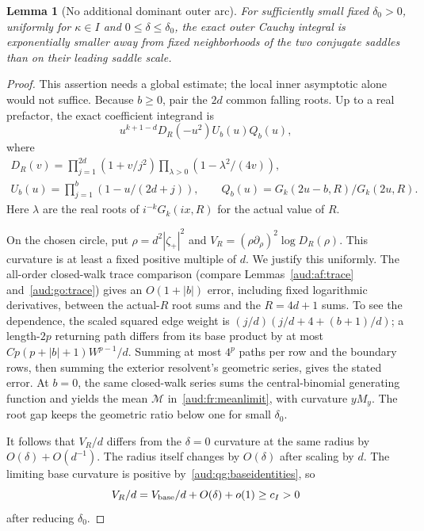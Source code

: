 \documentclass[11pt,a4paper]{article}
\numberwithin{equation}{section}
\newtheorem{lemma}[theorem]{Lemma}
\begin{document}
\begin{lemma}[No additional dominant outer arc]\label{aud:qg:outerglobal}
For sufficiently small fixed $\delta_0>0$, uniformly for $\kappa\in I$ and $0\le\delta\le\delta_0$, the exact outer Cauchy integral is exponentially smaller away from fixed neighborhoods of the two conjugate saddles than on their leading saddle scale.
\end{lemma}
\begin{proof}
This assertion needs a global estimate; the local inner asymptotic alone would not suffice. Because $b\ge0$, pair the $2d$ common falling roots. Up to a real prefactor, the exact coefficient integrand is
\begin{equation}\label{aud:qg:globalfactor}
 u^{k+1-d}D_R(-u^2)U_b(u)Q_b(u),
\end{equation}
where
\begin{gather*}
 D_R(v)=\prod_{j=1}^{2d}(1+v/j^2)
        \prod_{\lambda>0}(1-\lambda^2/(4v)),\\
 U_b(u)=\prod_{j=1}^b(1-u/(2d+j)),\qquad
 Q_b(u)=G_k(2u-b,R)/G_k(2u,R).
\end{gather*}
Here $\lambda$ are the real roots of $i^{-k}G_k(ix,R)$ for the actual value of $R$.

On the chosen circle, put $\rho=d^2|\zeta_+|^2$ and $V_R=(\rho\partial_\rho)^2\log D_R(\rho)$. This curvature is at least a fixed positive multiple of $d$. We justify this uniformly. The all-order closed-walk trace comparison (compare Lemmas~\ref{aud:af:trace} and~\ref{aud:go:trace}) gives an $O(1+|b|)$ error, including fixed logarithmic derivatives, between the actual-$R$ root sums and the $R=4d+1$ sums. To see the dependence, the scaled squared edge weight is
$(j/d)(j/d+4+(b+1)/d)$; a length-$2p$ returning path differs from its base product by at most $C p(p+|b|+1)W^{p-1}/d$. Summing at most $4^p$ paths per row and the boundary rows, then summing the exterior resolvent's geometric series, gives the stated error. At $b=0$, the same closed-walk series sums the central-binomial generating function and yields the mean $\mathcal M$ in~\eqref{aud:fr:meanlimit}, with curvature $yM_y$. The root gap keeps the geometric ratio below one for small $\delta_0$.

It follows that $V_R/d$ differs from the $\delta=0$ curvature at the same radius by $O(\delta)+O(d^{-1})$. The radius itself changes by $O(\delta)$ after scaling by $d$. The limiting base curvature is positive by~\eqref{aud:qg:baseidentities}, so
\begin{equation}\label{aud:qg:uniformVR}
 V_R/d=V_{\rm base}/d+O(\delta)+o(1)\ge c_I>0
\end{equation}
after reducing $\delta_0$.


\end{proof}
\end{document}
